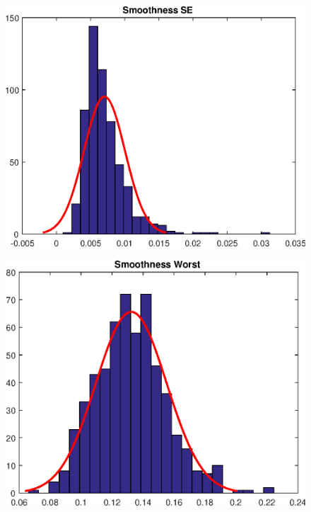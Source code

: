 \documentclass[11pt,a4paper]{article}
\numberwithin{equation}{section}
\begin{document}
\begin{itemize}
\begin{figure}[H]
\centering
\begin{minipage}{.5\textwidth}
  \centering
  \includegraphics[width=\linewidth]{./img/smoothness_se}
  \label{fig:test1}
\end{minipage}%
\begin{minipage}{.5\textwidth}
  \centering
  \includegraphics[width=\linewidth]{./img/smoothness_worst}
  \label{fig:test2}
\end{minipage}
\end{figure}


\end{itemize}
\end{document}
